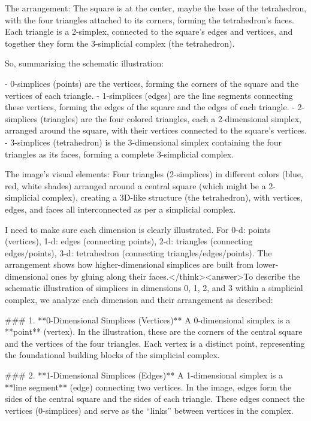 The arrangement: The square is at the center, maybe the base of the tetrahedron, with the four triangles attached to its corners, forming the tetrahedron's faces. Each triangle is a 2-simplex, connected to the square's edges and vertices, and together they form the 3-simplicial complex (the tetrahedron).

So, summarizing the schematic illustration:

- 0-simplices (points) are the vertices, forming the corners of the square and the vertices of each triangle.
- 1-simplices (edges) are the line segments connecting these vertices, forming the edges of the square and the edges of each triangle.
- 2-simplices (triangles) are the four colored triangles, each a 2-dimensional simplex, arranged around the square, with their vertices connected to the square's vertices.
- 3-simplices (tetrahedron) is the 3-dimensional simplex containing the four triangles as its faces, forming a complete 3-simplicial complex.

The image's visual elements: Four triangles (2-simplices) in different colors (blue, red, white shades) arranged around a central square (which might be a 2-simplicial complex), creating a 3D-like structure (the tetrahedron), with vertices, edges, and faces all interconnected as per a simplicial complex.

I need to make sure each dimension is clearly illustrated. For 0-d: points (vertices), 1-d: edges (connecting points), 2-d: triangles (connecting edges/points), 3-d: tetrahedron (connecting triangles/edges/points). The arrangement shows how higher-dimensional simplices are built from lower-dimensional ones by gluing along their faces.</think><answer>To describe the schematic illustration of simplices in dimensions 0, 1, 2, and 3 within a simplicial complex, we analyze each dimension and their arrangement as described:  


### 1. **0-Dimensional Simplices (Vertices)**  
A 0-dimensional simplex is a **point** (vertex). In the illustration, these are the corners of the central square and the vertices of the four triangles. Each vertex is a distinct point, representing the foundational building blocks of the simplicial complex.    

### 2. **1-Dimensional Simplices (Edges)**  
A 1-dimensional simplex is a **line segment** (edge) connecting two vertices. In the image, edges form the sides of the central square and the sides of each triangle. These edges connect the vertices (0-simplices) and serve as the “links” between vertices in the complex.    

